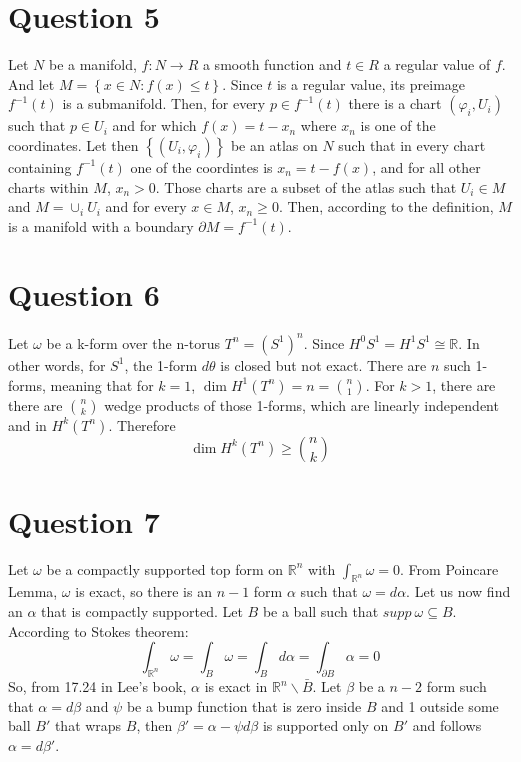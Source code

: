 \documentclass{article}
\newcommand{\R}{\ensuremath{\mathbb{R}}}
\begin{document}
\section*{Question 5}
Let $N$ be a manifold, $f: N \rightarrow R$ a smooth function and $t \in R$ a regular value of $f$. And let $M = \left\{x \in N : f(x) \le t\right\}$. Since $t$ is a regular value, its preimage $f^{-1}(t)$ is a submanifold.
\newline
Then, for every $p \in f^{-1}(t)$ there is a chart $(\varphi_i, U_i)$ such that $p \in U_i$ and for which $f(x) = t - x_n$ where $x_n$ is one of the coordinates. Let then $\left\{(U_i, \varphi_i)\right\}$ be an atlas on $N$ such that in every chart containing $f^{-1}(t)$ one of the coordintes is $x_n = t - f(x)$, and for all other charts within $M$, $x_n > 0$.
\newline
Those charts are a subset of the atlas such that $U_i \in M$ and $M = \cup_i U_i$ and for every $x \in M$, $x_n \ge 0$. Then, according to the definition, $M$ is a manifold with a boundary $\partial M = f^{-1}(t)$.

\section*{Question 6}
Let $\omega$ be a k-form over the n-torus $T^n = (S^1)^n$. Since $H^0 S^1 = H^1 S^1 \cong \R$. In other words, for $S^1$, the 1-form $d\theta$ is closed but not exact. There are $n$ such 1-forms, meaning that for $k=1$, $\dim H^1(T^n) = n = \binom{n}{1}$. For $k > 1$, there are there are $\binom{n}{k}$ wedge products of those 1-forms, which are linearly independent and in $H^k(T^n)$. Therefore
\begin{equation}
    \dim H^k (T^n) \ge \binom{n}{k}
\end{equation}

\section*{Question 7}
Let $\omega$ be a compactly supported top form on $\R^n$ with $\int_{\R^n}\omega = 0$. From Poincare Lemma, $\omega$ is exact, so there is an $n-1$ form $\alpha$ such that $\omega = d\alpha$. Let us now find an $\alpha$ that is compactly supported. Let $B$ be a ball such that $supp \ \omega \subseteq B$. According to Stokes theorem:
\begin{equation}
    \int_{\R^n}\omega = \int_{B}\omega = \int_{B}d\alpha = \int_{\partial B}\alpha = 0
\end{equation}
So, from 17.24 in Lee's book, $\alpha$ is exact in $\R^n \backslash \bar{B}$. Let $\beta$ be a $n-2$ form such that $\alpha = d\beta$ and $\psi$ be a bump function that is zero inside $B$ and 1 outside some ball $B'$ that wraps $B$, then $\beta' = \alpha - \psi d\beta$ is supported only on $B'$ and follows $\alpha = d\beta'$.
\end{document}
